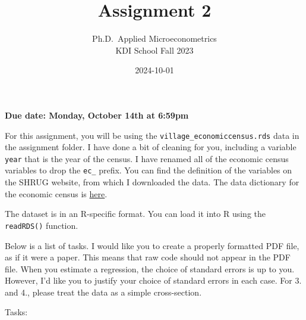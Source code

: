 \documentclass[
]{article}
\title{Assignment 2}
\subtitle{Ph.D.~Applied Microeconometrics\\
KDI School Fall 2023}
\author{}
\date{\vspace{-2.5em}2024-10-01}
\begin{document}
\maketitle

\textbf{Due date: Monday, October 14th at 6:59pm}

For this assignment, you will be using the \texttt{village\_economiccensus.rds} data in the assignment folder. I have done a bit of cleaning for you, including a variable \texttt{year} that is the year of the census. I have renamed all of the economic census variables to drop the \texttt{ec\_} prefix. You can find the definition of the variables on the SHRUG website, from which I downloaded the data. The data dictionary for the economic census is \href{https://docs.devdatalab.org/SHRUG-Metadata/Economic\%20Census/Tables/ec90-metadata/}{\textcolor{kdisgreen}{here}}.

The dataset is in an R-specific format. You can load it into R using the \texttt{readRDS()} function.

Below is a list of tasks. I would like you to create a properly formatted PDF file, as if it were a paper. This means that raw code should not appear in the PDF file. When you estimate a regression, the choice of standard errors is up to you. However, I'd like you to justify your choice of standard errors in each case. For 3. and 4., please treat the data as a simple cross-section.

Tasks:
\end{document}
